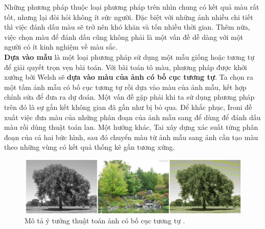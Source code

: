 \documentclass[a4paper, 12pt]{article}
\begin{document}
\noindent
Những phương pháp thuộc loại phương pháp trên nhìn chung có kết quả màu rất tốt, nhưng lại đòi hỏi không ít sức người. Đặc biệt với những ảnh nhiều chi tiết thì việc đánh dấu màu sẽ trở nên khó khăn và tốn nhiều thời gian. Thêm nữa, việc chọn màu để đánh dấu cũng không phải là một vấn đề dễ dàng với một người có ít kinh nghiệm về màu sắc.\vspace{5pt}\\
\textbf{Dựa vào mẫu} là một loại phương pháp sử dụng một mẫu giống hoặc tương tự để giải quyết trọn vẹn bài toán. Với bài toán tô màu, phương pháp được khởi xướng bởi Welsh \cite{welshcolorization} sẽ \textbf{dựa vào màu của ảnh có bố cục tương tự}. Ta chọn ra một tấm ảnh mẫu có bố cục tương tự rồi dựa vào màu của ảnh mẫu, kết hợp chỉnh sửa để đưa ra dự đoán. Một vấn đề gặp phải khi ta sử dụng phương pháp trên đó là sự gắn kết không gian đã gần như bị bỏ qua. Để khắc phục, Ironi \cite{ironicolorization} đề xuất việc đưa màu của những phân đoạn của ảnh mẫu sang để dùng để đánh dấu màu rồi dùng thuật toán lan. Một hướng khác, Tai \cite{taicolorization} xây dựng xác suất từng phân đoạn của cả hai bức hình, sau đó chuyển màu từ ảnh mẫu sang ảnh cần tạo màu theo những vùng có kết quả thống kê gần tương xứng.

\begin{figure}[!h]
\captionsetup{width=0.8\textwidth}
\centering
\includegraphics[width=15cm]{images/2_5.png}
\caption{Mô tả ý tưởng thuật toán ảnh có bố cục tương tự \cite{trungcolorization2018}.}
\label{fig:examplarmethod}
\end{figure}
\end{document}
